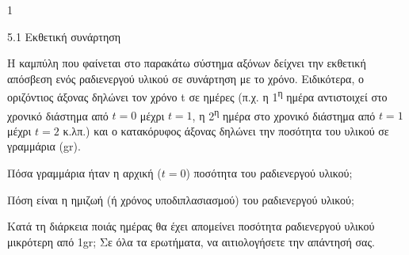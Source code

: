 \begin{ylh}{1}
\item 5.1 Εκθετική συνάρτηση
\end{ylh}
Η καμπύλη που φαίνεται στο παρακάτω σύστημα αξόνων δείχνει την εκθετική απόσβεση ενός ραδιενεργού υλικού σε συνάρτηση με το χρόνο. Ειδικότερα, ο οριζόντιος άξονας δηλώνει τον χρόνο t σε ημέρες (π.χ. η 1\textsuperscript{η} ημέρα αντιστοιχεί στο χρονικό διάστημα από $t = 0$ μέχρι $t = 1$, η 2\textsuperscript{η} ημέρα στο χρονικό διάστημα από $t = 1$ μέχρι $t = 2$ κ.λπ.) και ο κατακόρυφος άξονας δηλώνει την ποσότητα του υλικού σε γραμμάρια (gr).
\begin{center}
\end{center}
\begin{alist}
\item Πόσα γραμμάρια ήταν η αρχική ($t = 0$) ποσότητα του ραδιενεργού υλικού;
\item Πόση είναι η ημιζωή (ή χρόνος υποδιπλασιασμού) του ραδιενεργού υλικού;
\item Κατά τη διάρκεια ποιάς ημέρας θα έχει απομείνει ποσότητα ραδιενεργού υλικού μικρότερη από 1gr;
Σε όλα τα ερωτήματα, να αιτιολογήσετε την απάντησή σας.
\end{alist}

